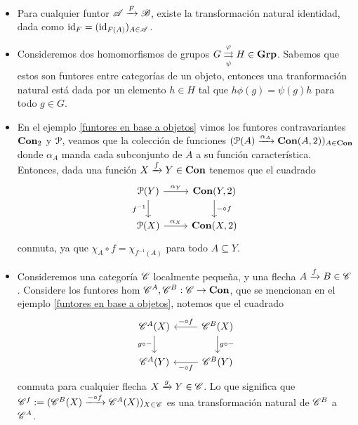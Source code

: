 \documentclass{comunicaciones}
\begin{document}
\begin{ej}\label{ejTN}
    \begin{itemize}
    \item Para cualquier funtor $\mathscr A\xrightarrow{F}\mathscr B$, existe la transformación natural identidad, dada como $\mathrm{id}_F=(\mathrm{id}_{F(A)})_{A\in\mathscr A}$.
    \item Consideremos dos homomorfismos de grupos $G\overset{\varphi}{\underset{\psi}{\rightrightarrows}}H\in\mathbf{Grp}$. Sabemos que estos son funtores entre categorías
    de un objeto, entonces una tranformación natural está dada por un elemento $h\in H$ tal que $h\phi(g)=\psi(g)h$ para todo $g\in G$.
    \item En el ejemplo \ref{funtores en base a objetos} vimos los funtores contravariantes $\mathbf{Con}_2$ y $\mathcal{P}$, veamos que la colección de funciones 
    $(\mathcal{P}(A)\xrightarrow{\alpha_A}\mathbf{Con}(A,2))_{A\in\mathbf{Con}}$ donde $\alpha_A$ manda cada subconjunto de $A$ a su función característica. Entonces, dada una 
    función $X\xrightarrow{f}Y\in\mathbf{Con}$ tenemos que el cuadrado
    \[\begin{tikzcd}
        {\Cal P(Y)} & {\Con(Y,2)} \\
        {\Cal P(X)} & {\Con(X,2)}
        \arrow["{\alpha_Y}", from=1-1, to=1-2]
        \arrow["{f^{-1}}"', from=1-1, to=2-1]
        \arrow["{-\circ f}", from=1-2, to=2-2]
        \arrow["{\alpha_X}", from=2-1, to=2-2]
    \end{tikzcd}\]
    conmuta, ya que $\chi_A\circ f=\chi_{f^{-1}(A)}$ para todo $A\subseteq Y$.
    \item Consideremos una categoría $\mathscr C$ localmente pequeña, y una flecha $A\xrightarrow{f}B\in\mathscr C$. Considere los funtores hom $\mathscr C^A,\mathscr C^B:\mathscr C\to\mathbf{Con}$, que se
    mencionan en el ejemplo \ref{funtores en base a objetos}, notemos que el cuadrado
    \[\begin{tikzcd}
        {\C^A(X)} & {\C^B(X)} \\
        {\C^A(Y)} & {\C^B(Y)}
        \arrow["{g\circ -}"', from=1-1, to=2-1]
        \arrow["{-\circ f}"', from=1-2, to=1-1]
        \arrow["{g\circ -}", from=1-2, to=2-2]
        \arrow["{-\circ f}", from=2-2, to=2-1]
    \end{tikzcd}\]
    conmuta para cualquier flecha $X\xrightarrow{g}Y\in\mathscr C$. Lo que significa que $\mathscr C^f:=(\mathscr C^B(X)\xrightarrow{-\circ f}\mathscr C^A(X))_{X\in\mathscr C}$ es una transformación
    natural de $\mathscr C^B$ a $\mathscr C^A$.
    \end{itemize}
\end{ej}
\end{document}
